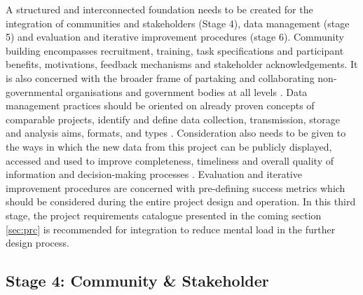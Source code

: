A structured and interconnected foundation needs to be created for the integration of communities and stakeholders (Stage 4), data management (stage 5) and evaluation and iterative improvement procedures (stage 6). Community building encompasses recruitment, training, task specifications and participant benefits, motivations, feedback mechanisms and stakeholder acknowledgements. It is also concerned with the broader frame of partaking and collaborating non-governmental organisations and government bodies at all levels \autocite{conradReviewCitizenScience2011}. Data management practices should be oriented on already proven concepts of comparable projects, identify and define data collection, transmission, storage and analysis aims, formats, and types \autocite{fraislCitizenScienceEnvironmental2022,gualazziniEWEAEarlyWarning2021,ifrcCommunityBasedSurveillanceGuiding2017}. Consideration also needs to be given to the ways in which the new data from this project can be publicly displayed, accessed and used to improve completeness, timeliness and overall quality of information and decision-making processes \autocite{conradMeaningfulCommunityBasedEcological2006}. Evaluation and iterative improvement procedures are concerned with pre-defining success metrics which should be considered during the entire project design and operation.\newline
In this third stage, the project requirements catalogue presented in the coming section \ref{sec:prc} is recommended for integration to reduce mental load in the further design process.

\subsection{Stage 4: Community \& Stakeholder}\label{subsec:stage4_design}

